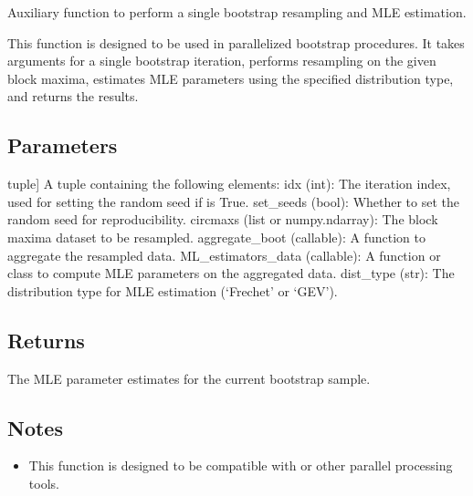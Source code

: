 \documentclass[a4paper,11pt,openany,english]{sphinxmanual}
\begin{document}
\begin{fulllineitems}
\label{\detokenize{api_bootstrap:xtremes.bootstrap.bootstrap_worker}}
\pysigstartsignatures
{}
\pysigstopsignatures
\sphinxAtStartPar
Auxiliary function to perform a single bootstrap resampling and MLE estimation.

\sphinxAtStartPar
This function is designed to be used in parallelized bootstrap procedures. It takes arguments for a single 
bootstrap iteration, performs resampling on the given block maxima, estimates MLE parameters using the 
specified distribution type, and returns the results.


\subsection{Parameters}
\label{\detokenize{api_bootstrap:id20}}\begin{description}
\sphinxlineitem{args}{[}tuple{]}
\sphinxAtStartPar
A tuple containing the following elements:
\sphinxhyphen{} idx (int): The iteration index, used for setting the random seed if  is True.
\sphinxhyphen{} set\_seeds (bool): Whether to set the random seed for reproducibility.
\sphinxhyphen{} circmaxs (list or numpy.ndarray): The block maxima dataset to be resampled.
\sphinxhyphen{} aggregate\_boot (callable): A function to aggregate the resampled data.
\sphinxhyphen{} ML\_estimators\_data (callable): A function or class to compute MLE parameters on the aggregated data.
\sphinxhyphen{} dist\_type (str): The distribution type for MLE estimation (‘Frechet’ or ‘GEV’).

\end{description}


\subsection{Returns}
\label{\detokenize{api_bootstrap:id21}}\begin{description}
\sphinxAtStartPar
The MLE parameter estimates for the current bootstrap sample.

\end{description}


\subsection{Notes}
\label{\detokenize{api_bootstrap:id22}}\begin{itemize}
\item {} 
\sphinxAtStartPar
This function is designed to be compatible with  or other parallel processing tools.


\end{itemize}
\end{fulllineitems}
\end{document}
